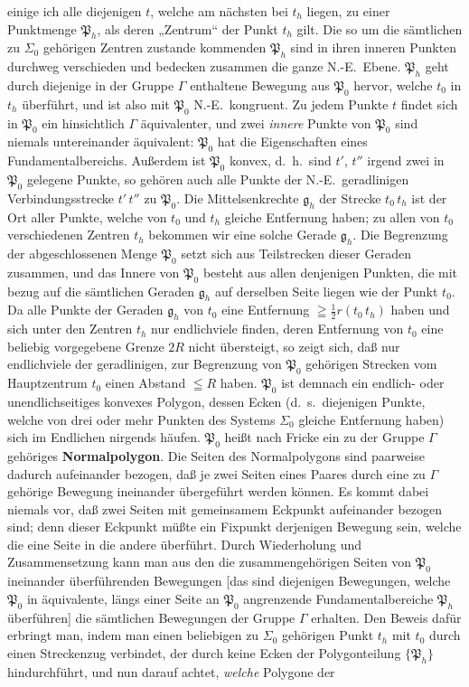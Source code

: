\documentclass{article}
\begin{document}
einige ich alle diejenigen $t$, welche am nächsten bei $t_h$ liegen, zu einer Punktmenge $\mathfrak{P}_h$, als deren „Zentrum“ der Punkt $t_h$ gilt. Die so um die sämtlichen zu $\Sigma_0$ gehörigen Zentren zustande kommenden $\mathfrak{P}_h$ sind in ihren inneren Punkten durchweg verschieden und bedecken zusammen die ganze N.-E.\ Ebene. $\mathfrak{P}_h$ geht durch diejenige in der Gruppe $\varGamma$ enthaltene Bewegung aus $\mathfrak{P}_0$ hervor, welche $t_0$ in $t_h$ überführt, und ist also mit $\mathfrak{P}_0$ N.-E.\ kongruent. Zu jedem Punkte $t$ findet sich in $\mathfrak{P}_0$ ein hinsichtlich $\varGamma$ äquivalenter, und zwei \emph{innere} Punkte von $\mathfrak{P}_0$ sind niemals untereinander äquivalent: $\mathfrak{P}_0$ hat die Eigenschaften eines Fundamentalbereichs. Außerdem ist $\mathfrak{P}_0$ konvex, d.~h.\ sind $t'$, $t''$ irgend zwei in $\mathfrak{P}_0$ gelegene Punkte, so gehören auch alle Punkte der N.-E.\ geradlinigen Verbindungsstrecke $t'\,t''$ zu $\mathfrak{P}_0$. Die Mittelsenkrechte $\mathfrak{g}_h$ der Strecke $t_0\,t_h$ ist der Ort aller Punkte, welche von $t_0$ und $t_h$ gleiche Entfernung haben; zu allen von $t_0$ verschiedenen Zentren $t_h$ bekommen wir eine solche Gerade $\mathfrak{g}_h$. Die Begrenzung der abgeschlossenen Menge $\mathfrak{P}_0$ setzt sich aus Teilstrecken dieser Geraden zusammen, und das Innere von $\mathfrak{P}_0$ besteht aus allen denjenigen Punkten, die mit bezug auf die sämtlichen Geraden $\mathfrak{g}_h$ auf derselben Seite liegen wie der Punkt $t_0$. Da alle Punkte der Geraden $\mathfrak{g}_h$ von $t_0$ eine Entfernung $\geqq \frac{1}{2} r(t_0\,t_h)$ haben und sich unter den Zentren $t_h$ nur endlichviele finden, deren Entfernung von $t_0$ eine beliebig vorgegebene Grenze $2R$ nicht übersteigt, so zeigt sich, daß nur endlichviele der geradlinigen, zur Begrenzung von $\mathfrak{P}_0$ gehörigen Strecken vom Hauptzentrum $t_0$ einen Abstand $\leqq R$ haben. $\mathfrak{P}_0$ ist demnach ein endlich- oder unendlichseitiges konvexes Polygon, dessen Ecken (d.~s.\ diejenigen Punkte, welche von drei oder mehr Punkten des Systems $\Sigma_0$ gleiche Entfernung haben) sich im Endlichen nirgends häufen. $\mathfrak{P}_0$ heißt nach Fricke ein zu der Gruppe $\varGamma$ gehöriges \textbf{Normalpolygon}. Die Seiten des Normalpolygons sind paarweise dadurch aufeinander bezogen, daß je zwei Seiten eines Paares durch eine zu $\varGamma$ gehörige Bewegung ineinander übergeführt werden können. Es kommt dabei niemals vor, daß zwei Seiten mit gemeinsamem Eckpunkt aufeinander bezogen sind; denn dieser Eckpunkt müßte ein Fixpunkt derjenigen Bewegung sein, welche die eine Seite in die andere überführt. Durch Wiederholung und Zusammensetzung kann man aus den die zusammengehörigen Seiten von $\mathfrak{P}_0$ ineinander überführenden Bewegungen [das sind diejenigen Bewegungen, welche $\mathfrak{P}_0$ in äquivalente, längs einer Seite an $\mathfrak{P}_0$ angrenzende Fundamentalbereiche $\mathfrak{P}_h$ überführen] die sämtlichen Bewegungen der Gruppe $\varGamma$ erhalten. Den Beweis dafür erbringt man, indem man einen beliebigen zu $\Sigma_0$ gehörigen Punkt $t_h$ mit $t_0$ durch einen Streckenzug verbindet, der durch keine Ecken der Polygonteilung $\{\mathfrak{P}_h\}$ hindurchführt, und nun darauf achtet, \emph{welche} Polygone der 
\end{document}
